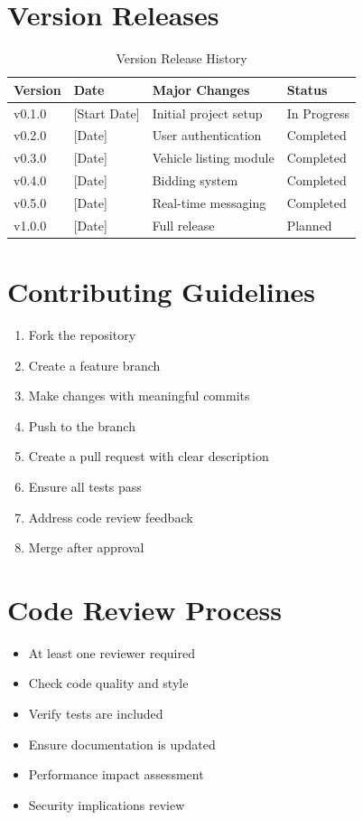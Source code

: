 \section{Version Releases}

\begin{table}[H]
    \centering
    \begin{tabular}{|l|l|p{3cm}|l|}
    \hline
    \textbf{Version} & \textbf{Date} & \textbf{Major Changes} & \textbf{Status} \\
    \hline
    v0.1.0 & [Start Date] & Initial project setup & In Progress \\
    \hline
    v0.2.0 & [Date] & User authentication & Completed \\
    \hline
    v0.3.0 & [Date] & Vehicle listing module & Completed \\
    \hline
    v0.4.0 & [Date] & Bidding system & Completed \\
    \hline
    v0.5.0 & [Date] & Real-time messaging & Completed \\
    \hline
    v1.0.0 & [Date] & Full release & Planned \\
    \hline
    \end{tabular}
    \caption{Version Release History}
\end{table}

\section{Contributing Guidelines}

\begin{enumerate}
    \item Fork the repository
    \item Create a feature branch
    \item Make changes with meaningful commits
    \item Push to the branch
    \item Create a pull request with clear description
    \item Ensure all tests pass
    \item Address code review feedback
    \item Merge after approval
\end{enumerate}

\section{Code Review Process}

\begin{itemize}
    \item At least one reviewer required
    \item Check code quality and style
    \item Verify tests are included
    \item Ensure documentation is updated
    \item Performance impact assessment
    \item Security implications review
\end{itemize}

